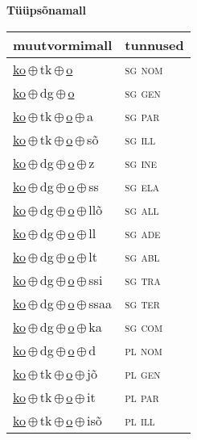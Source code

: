 

\vspace{3.5em}
\noindent \begin{minipage}{\textwidth}
\noindent \textbf{Tüüpsõnamall \,}\\

\begin{sideways}
\begin{tabular}{l l}
muutvormimall & tunnused \\
\hline
\underline{ko}\,$\oplus$\,tk\,$\oplus$\,\underline{o} & \textsc{ sg nom } \\
\underline{ko}\,$\oplus$\,dg\,$\oplus$\,\underline{o} & \textsc{ sg gen } \\
\underline{ko}\,$\oplus$\,tk\,$\oplus$\,\underline{o}\,$\oplus$\,a & \textsc{ sg par } \\
\underline{ko}\,$\oplus$\,tk\,$\oplus$\,\underline{o}\,$\oplus$\,sõ & \textsc{ sg ill } \\
\underline{ko}\,$\oplus$\,dg\,$\oplus$\,\underline{o}\,$\oplus$\,z & \textsc{ sg ine } \\
\underline{ko}\,$\oplus$\,dg\,$\oplus$\,\underline{o}\,$\oplus$\,ss & \textsc{ sg ela } \\
\underline{ko}\,$\oplus$\,dg\,$\oplus$\,\underline{o}\,$\oplus$\,llõ & \textsc{ sg all } \\
\underline{ko}\,$\oplus$\,dg\,$\oplus$\,\underline{o}\,$\oplus$\,ll & \textsc{ sg ade } \\
\underline{ko}\,$\oplus$\,dg\,$\oplus$\,\underline{o}\,$\oplus$\,lt & \textsc{ sg abl } \\
\underline{ko}\,$\oplus$\,dg\,$\oplus$\,\underline{o}\,$\oplus$\,ssi & \textsc{ sg tra } \\
\underline{ko}\,$\oplus$\,dg\,$\oplus$\,\underline{o}\,$\oplus$\,ssaa & \textsc{ sg ter } \\
\underline{ko}\,$\oplus$\,dg\,$\oplus$\,\underline{o}\,$\oplus$\,ka & \textsc{ sg com } \\
\underline{ko}\,$\oplus$\,dg\,$\oplus$\,\underline{o}\,$\oplus$\,d & \textsc{ pl nom } \\
\underline{ko}\,$\oplus$\,tk\,$\oplus$\,\underline{o}\,$\oplus$\,jõ & \textsc{ pl gen } \\
\underline{ko}\,$\oplus$\,tk\,$\oplus$\,\underline{o}\,$\oplus$\,it & \textsc{ pl par } \\
\underline{ko}\,$\oplus$\,tk\,$\oplus$\,\underline{o}\,$\oplus$\,isõ & \textsc{ pl ill } \\

\end{tabular}
\end{sideways}
\end{minipage}
